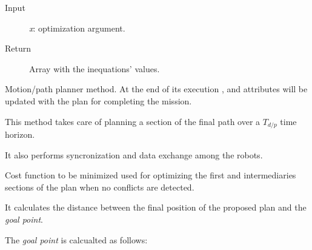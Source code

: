 \documentclass[letterpaper,10pt,english]{sphinxmanual}
\begin{document}
\begin{fulllineitems}
\begin{fulllineitems}
\begin{description}
\item[{Input}] \leavevmode
\emph{x}: optimization argument.

\item[{Return}] \leavevmode
Array with the inequations' values.

\end{description}

\end{fulllineitems}


\begin{fulllineitems}
\label{Multi-robot motion planner:planning_sim.Robot._plan}
Motion/path planner method. At the end of its execution {\hyperref[Multi-robot motion planner:planning_sim.Robot.rtime]{}}, {\hyperref[Multi-robot motion planner:planning_sim.Robot.ctime]{}}
and {\hyperref[Multi-robot motion planner:planning_sim.Robot.sol]{}} attributes will be updated with the plan for completing the mission.

\end{fulllineitems}


\begin{fulllineitems}
\label{Multi-robot motion planner:planning_sim.Robot._plan_section}
This method takes care of planning a section of the final path over a \(T_{d/p}\)
time horizon.

It also performs syncronization and data exchange among the robots.

\end{fulllineitems}


\begin{fulllineitems}
\label{Multi-robot motion planner:planning_sim.Robot._sa_criterion}
Cost function to be minimized used for optimizing
the first and intermediaries sections of the plan when no conflicts are detected.

It calculates the distance between the final position of the proposed plan and
the \emph{goal point}.

The \emph{goal point} is calcualted as follows:


\end{fulllineitems}
\end{fulllineitems}
\end{document}
